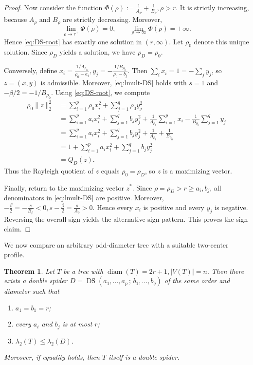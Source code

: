 \documentclass[11pt]{article}
\newtheorem{theorem}{Theorem}[section]
\theoremstyle{remark}
\newcommand{\diam}{\operatorname{diam}}
\newcommand{\DS}{\operatorname{DS}}
\begin{document}
\begin{proof}
Now consider the function
$\Phi(\rho):=\frac1{A_\rho}+\frac1{B_\rho}, \rho>r.$
It is strictly increasing, because $A_\rho$ and $B_\rho$ are strictly decreasing.
Moreover,
$$
\lim_{\rho\to r^+}\Phi(\rho)=0,
\qquad
\lim_{\rho\to\infty}\Phi(\rho)=+\infty.
$$
Hence \eqref{eq:DS-root} has exactly one solution in $(r,\infty)$.
Let $\rho_0$ denote this unique solution.
Since $\rho_D$ yields a solution, we have $\rho_D=\rho_0$.

Conversely, define
$x_i=\frac{1/A_{\rho_0}}{\rho_0-a_i}, y_j=-\frac{1/B_{\rho_0}}{\rho_0-b_j}.$
Then $\sum_i x_i=1=-\sum_j y_j$, so $z=(x,y)$ is admissible.
Moreover, \eqref{eq:lmult-DS} holds with $s=1$ and $-\beta/2=-1/B_{\rho_0}$.
Using \eqref{eq:DS-root}, we compute
\begin{align*}
\rho_0\|z\|_2^2
&= \sum_{i=1}^p \rho_0 x_i^2 + \sum_{j=1}^q \rho_0 y_j^2 \\
&= \sum_{i=1}^p a_i x_i^2 + \sum_{j=1}^q b_j y_j^2
   + \frac1{A_{\rho_0}}\sum_{i=1}^p x_i - \frac1{B_{\rho_0}}\sum_{j=1}^q y_j \\
&= \sum_{i=1}^p a_i x_i^2 + \sum_{j=1}^q b_j y_j^2 + \frac1{A_{\rho_0}}+\frac1{B_{\rho_0}} \\
&= 1 + \sum_{i=1}^p a_i x_i^2 + \sum_{j=1}^q b_j y_j^2 \\
&= Q_D(z).
\end{align*}
Thus the Rayleigh quotient of $z$ equals $\rho_0=\rho_D$, so $z$ is a maximizing vector.

Finally, return to the maximizing vector $z^\ast$.
Since $\rho=\rho_D>r\ge a_i,b_j$, all denominators in \eqref{eq:lmult-DS} are positive.
Moreover,
$-\frac{\beta}{2}=-\frac{s}{B_\rho}<0, s-\frac{\beta}{2}=\frac{s}{A_\rho}>0.$
Hence every $x_i$ is positive and every $y_j$ is negative.
Reversing the overall sign yields the alternative sign pattern.
This proves the sign claim.
\end{proof}

We now compare an arbitrary odd-diameter tree with a suitable two-center profile.

\begin{theorem}\label{thm:DS-domination}
Let $T$ be a tree with
$\diam(T)=2r+1, |V(T)|=n.$
Then there exists a double spider
$D=\DS(a_1,\dots,a_p\,;\,b_1,\dots,b_q)$
of the same order and diameter such that
\begin{enumerate}[label=\textnormal{(\roman*)}]
    \item $a_1=b_1=r$;
    \item every $a_i$ and $b_j$ is at most $r$;
    \item $\lambda_2(T)\le \lambda_2(D)$.
\end{enumerate}
Moreover, if equality holds, then $T$ itself is a double spider.
\end{theorem}
\end{document}
